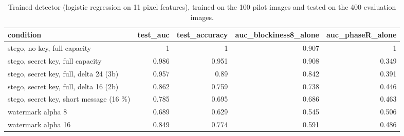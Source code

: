 \begin{table}[htbp]
\caption{Trained detector (logistic regression on 11 pixel features), trained on the 100 pilot images and tested on the 400 evaluation images.}
\label{tab:ml_steganalysis}
\begin{tabular}{lrrrr}
\toprule
condition & test\_auc & test\_accuracy & auc\_blockiness8\_alone & auc\_phaseR\_alone \\
\midrule
stego, no key, full capacity & 1 & 1 & 0.907 & 1 \\
stego, secret key, full capacity & 0.986 & 0.951 & 0.908 & 0.349 \\
stego, secret key, full, delta 24 (3b) & 0.957 & 0.89 & 0.842 & 0.391 \\
stego, secret key, full, delta 16 (2b) & 0.862 & 0.759 & 0.738 & 0.446 \\
stego, secret key, short message (16 \%) & 0.785 & 0.695 & 0.686 & 0.463 \\
watermark alpha 8 & 0.689 & 0.629 & 0.545 & 0.506 \\
watermark alpha 16 & 0.849 & 0.774 & 0.591 & 0.486 \\
\bottomrule
\end{tabular}
\end{table}
